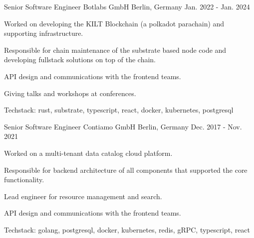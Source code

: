 


\begin{cventries}


\cventry
{Senior Software Engineer} %
{Botlabs GmbH} %
{Berlin, Germany} %
{Jan. 2022 - Jan. 2024} %
{ %
\begin{cvitems}
\item {Worked on developing the KILT Blockchain (a polkadot parachain) and supporting infrastructure.}
\item {Responsible for chain maintenance of the substrate based node code and developing fullstack solutions on top of the chain.}
\item {API design and communications with the frontend teams.}
\item {Giving talks and workshops at conferences.}
\item {Techstack: rust, substrate, typescript, react, docker, kubernetes, postgresql}
\end{cvitems}
}


\cventry
{Senior Software Engineer} %
{Contiamo GmbH} %
{Berlin, Germany} %
{Dec. 2017 - Nov. 2021} %
{ %
\begin{cvitems}
\item {Worked on a multi-tenant data catalog cloud platform.}
\item {Responsible for backend architecture of all components that supported the core functionality.}
\item {Lead engineer for resource management and search.}
\item {API design and communications with the frontend teams.}
\item {Techstack: golang, postgresql, docker, kubernetes, redis, gRPC, typescript, react}
\end{cvitems}
}


\end{cventries}
